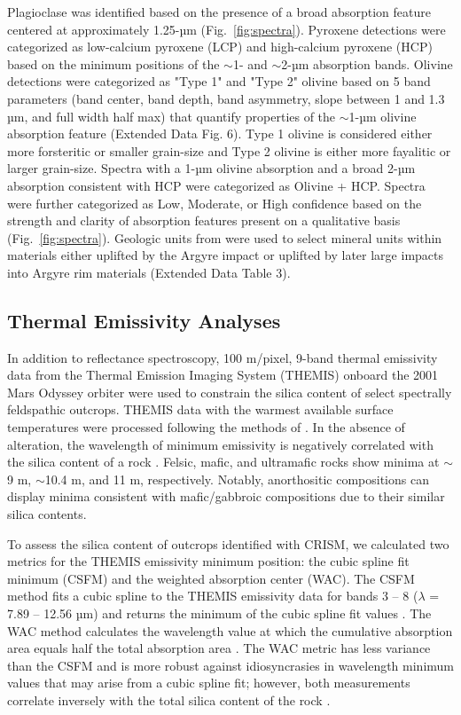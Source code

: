 \documentclass[11pt]{article}
\begin{document}
Plagioclase was identified based on the presence of a broad absorption feature centered at approximately 1.25-µm (Fig.~\ref{fig:spectra}). Pyroxene detections were categorized as low-calcium pyroxene (LCP) and high-calcium pyroxene (HCP) based on the minimum positions of the $\sim$1- and $\sim$2-µm absorption bands. Olivine detections were categorized as "Type 1" and "Type 2" olivine \citep{Ody2013} based on 5 band parameters (band center, band depth, band asymmetry, slope between 1 and 1.3 µm, and full width half max) that quantify properties of the $\sim$1-µm olivine absorption feature (Extended Data Fig. 6). Type 1 olivine is considered either more forsteritic or smaller grain-size and Type 2 olivine is either more fayalitic or larger grain-size. Spectra with a 1-µm olivine absorption and a broad 2-µm absorption consistent with HCP were categorized as Olivine + HCP. Spectra were further categorized as Low, Moderate, or High confidence based on the strength and clarity of absorption features present on a qualitative basis (Fig.~\ref{fig:spectra}). Geologic units from \citet{Dohm2015} were used to select mineral units within materials either uplifted by the Argyre impact or uplifted by later large impacts into Argyre rim materials (Extended Data Table 3).

\subsection*{Thermal Emissivity Analyses}

In addition to reflectance spectroscopy, 100 m/pixel, 9-band thermal emissivity data from the Thermal Emission Imaging System (THEMIS) onboard the 2001 Mars Odyssey orbiter \citep{Christensen2004} were used to constrain the silica content of select spectrally feldspathic outcrops. THEMIS data with the warmest available surface temperatures were processed following the methods of \citet{Bandfield2004}. In the absence of alteration, the wavelength of minimum emissivity is negatively correlated with the silica content of a rock \citep{Lyon1965}. Felsic, mafic, and ultramafic rocks show minima at $\sim$9 \textmu m, $\sim$10.4 \textmu m, and 11 \textmu m, respectively. Notably, anorthositic compositions can display minima consistent with mafic/gabbroic compositions due to their similar silica contents.

To assess the silica content of outcrops identified with CRISM, we calculated two metrics for the THEMIS emissivity minimum position: the cubic spline fit minimum (CSFM) and the weighted absorption center (WAC). The CSFM method fits a cubic spline to the THEMIS emissivity data for bands 3 -- 8 ($\lambda$ = 7.89 -- 12.56 µm) and returns the minimum of the cubic spline fit values \citep{Rogers2015}. The WAC method calculates the wavelength value at which the cumulative absorption area equals half the total absorption area \citep{Vincent1972, Smith2013, Amador2016}. The WAC metric has less variance than the CSFM and is more robust against idiosyncrasies in wavelength minimum values that may arise from a cubic spline fit; however, both measurements correlate inversely with the total silica content of the rock \citep{Vincent1972, Walter1989, Rogers2015, Amador2016}.
\end{document}
